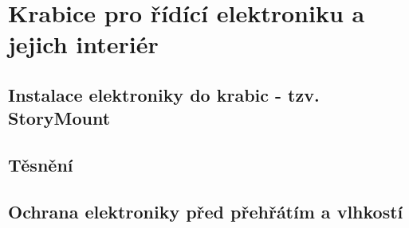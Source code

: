 \section{Krabice pro řídící elektroniku a jejich interiér}


\subsection{Instalace elektroniky do krabic - tzv. StoryMount}


\subsection{Těsnění}


\subsection{Ochrana elektroniky před přehřátím a vlhkostí}


\newpage
